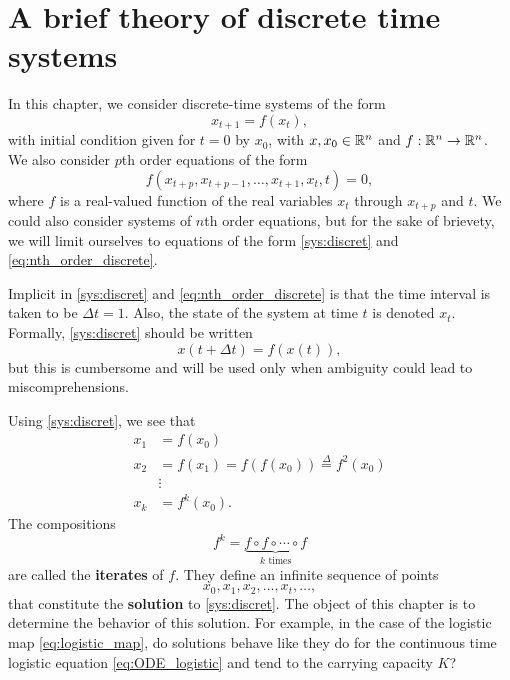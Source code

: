 \chapter{A brief theory of discrete time systems}
\label{chap:theory_discrete_time}

In this chapter, we consider discrete-time systems of the form
\begin{equation}\label{sys:discret}
x_{t+1}=f(x_t),
\end{equation}
with initial condition given for $t=0$ by $x_0$, with $x,x_0\in\mathbb{R}^n$ and $f:\mathbb{R}^n\to\mathbb{R}^n$.
We also consider $p$th order equations of the form
\begin{equation}\label{eq:nth_order_discrete}
f(x_{t+p},x_{t+p-1},\dots,x_{t+1},x_t,t)=0,
\end{equation}
where $f$ is a real-valued function of the real variables $x_t$ through $x_{t+p}$ and $t$. We could also consider systems of $n$th order equations, but for the sake of brievety, we will limit ourselves to equations of the form \eqref{sys:discret} and \eqref{eq:nth_order_discrete}.

Implicit in \eqref{sys:discret} and \eqref{eq:nth_order_discrete} is that the time interval is taken to be $\Delta t=1$. Also, the state of the system at time $t$ is denoted $x_t$. Formally, \eqref{sys:discret} should be written
\[
x(t+\Delta t)=f(x(t)),
\]
but this is cumbersome and will be used only when ambiguity could lead to miscomprehensions.

Using \eqref{sys:discret}, we see that
\begin{align*}
x_1 &= f(x_0) \\
x_2 &= f(x_1)= f(f(x_0))\stackrel{\Delta}{=} f^2(x_0) \\
& \vdots \\
x_k &= f^k(x_0).
\end{align*}
The compositions
\[
f^k=\underbrace{f\circ f\circ\cdots\circ f}_{k\textrm{ times}}
\]
are called the \textbf{iterates} of $f$.
They define an infinite sequence of points
\[
x_0,x_1,x_2,\ldots,x_t,\ldots,
\]
that constitute the \textbf{solution} to \eqref{sys:discret}. The object of this chapter is to determine the behavior of this solution. For example, in the case of the logistic map \eqref{eq:logistic_map}, do solutions behave like they do for the continuous time logistic equation \eqref{eq:ODE_logistic} and tend to the carrying capacity $K$?


